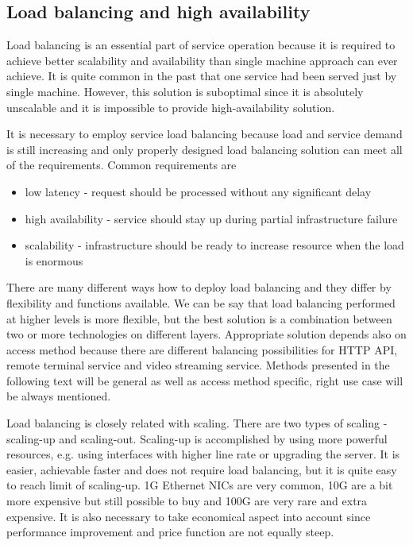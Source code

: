 \subsection{Load balancing and high availability}

Load balancing is an essential part of service operation because it is required to achieve better scalability and availability than single machine approach can ever achieve. It is quite common in the past that one service had been served just by single machine. However, this solution is suboptimal since it is absolutely unscalable and it is impossible to provide high-availability solution.

It is necessary to employ service load balancing because load and service demand is still increasing and only properly designed load balancing solution can meet all of the requirements. Common requirements are
	\begin{itemize}
		\item low latency - request should be processed without any significant delay
		\item high availability - service should stay up during partial infrastructure failure
		\item scalability - infrastructure should be ready to increase resource when the load is enormous
	\end{itemize}

There are many different ways how to deploy load balancing and they differ by flexibility and functions available. We can be say that load balancing performed at higher levels is more flexible, but the best solution is a combination between two or more technologies on different layers. Appropriate solution depends also on access method because there are different balancing possibilities for \Ac{HTTP} \Ac{API}, remote terminal service and video streaming service. Methods presented in the following text will be general as well as access method specific, right use case will be always mentioned.

Load balancing is closely related with scaling. There are two types of scaling - scaling-up and scaling-out. Scaling-up is accomplished by using more powerful resources, e.g. using interfaces with higher line rate or upgrading the server. It is easier, achievable faster and does not require load balancing, but it is quite easy to reach limit of scaling-up. 1G Ethernet \Ac{NIC}s are very common, 10G are a bit more expensive but still possible to buy and 100G are very rare and extra expensive. It is also necessary to take economical aspect into account since performance improvement and price function are not equally steep. 

